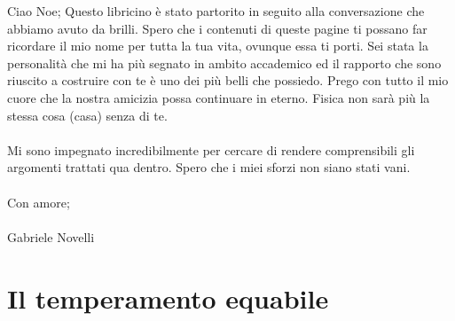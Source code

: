\documentclass[12pt,a4paper]{report}
\theoremstyle{definition}
\theoremstyle{Theorem}
\theoremstyle{definition}
\theoremstyle{definition}
\theoremstyle{definition}
\begin{document}
	Ciao Noe;
	Questo libricino è stato partorito in seguito alla conversazione che abbiamo avuto da brilli. Spero che i contenuti di queste pagine ti possano far ricordare il mio nome per tutta la tua vita, ovunque essa ti porti. Sei stata la personalità che mi ha più segnato in ambito accademico ed il rapporto che sono riuscito a costruire con te è uno dei più belli che possiedo. Prego con tutto il mio cuore che la nostra amicizia possa continuare in eterno. Fisica non sarà più la stessa cosa (casa) senza di te. \\
	\\
	Mi sono impegnato incredibilmente per cercare di rendere comprensibili gli argomenti trattati qua dentro. Spero che i miei sforzi non siano stati vani.\\
	\\
	Con amore;\\\\
	Gabriele Novelli
	\chapter{Il temperamento equabile}
\end{document}
